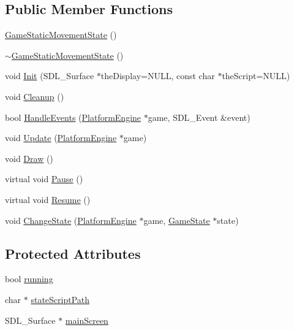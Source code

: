 \subsection*{Public Member Functions}
\begin{CompactItemize}
\item 
\hyperlink{class_platform_1_1_game_static_movement_state_9f8e07bb645bb7d7137ca1cb432dd29b}{GameStaticMovementState} ()
\item 
\hyperlink{class_platform_1_1_game_static_movement_state_398bacded03a5bf659ae866c5cc61459}{$\sim$GameStaticMovementState} ()
\item 
void \hyperlink{class_platform_1_1_game_static_movement_state_751b633b6a42bf1a85a9081f31dac4e1}{Init} (SDL\_\-Surface $\ast$theDisplay=NULL, const char $\ast$theScript=NULL)
\item 
void \hyperlink{class_platform_1_1_game_static_movement_state_4ae9849145c65e3a7276c545c5bbda18}{Cleanup} ()
\item 
bool \hyperlink{class_platform_1_1_game_static_movement_state_aa0e9df9b7b26c71096d60debf92774b}{HandleEvents} (\hyperlink{class_platform_1_1_platform_engine}{PlatformEngine} $\ast$game, SDL\_\-Event \&event)
\item 
void \hyperlink{class_platform_1_1_game_static_movement_state_07ccc3a9b700867379fae0745451ceff}{Update} (\hyperlink{class_platform_1_1_platform_engine}{PlatformEngine} $\ast$game)
\item 
void \hyperlink{class_platform_1_1_game_static_movement_state_8063dc783ff51732472010f23bed78e7}{Draw} ()
\item 
virtual void \hyperlink{class_platform_1_1_game_state_aa49568d0da70ded81719cfa83052028}{Pause} ()
\item 
virtual void \hyperlink{class_platform_1_1_game_state_d2a5e5f3ba807bbf9445baba9f36fea7}{Resume} ()
\item 
void \hyperlink{class_platform_1_1_game_state_602091629b4bca2073f12bfa6c61e6d0}{ChangeState} (\hyperlink{class_platform_1_1_platform_engine}{PlatformEngine} $\ast$game, \hyperlink{class_platform_1_1_game_state}{GameState} $\ast$state)
\end{CompactItemize}
\subsection*{Protected Attributes}
\begin{CompactItemize}
\item 
bool \hyperlink{class_platform_1_1_game_state_2e64c5095158f8a2d03d180d701af768}{running}
\item 
char $\ast$ \hyperlink{class_platform_1_1_game_state_791f4e1dc5c097e707cdca3499fe7ff1}{stateScriptPath}
\item 
SDL\_\-Surface $\ast$ \hyperlink{class_platform_1_1_game_state_12616fd9e6b9620fb0c8228a35aec98a}{mainScreen}
\end{CompactItemize}


